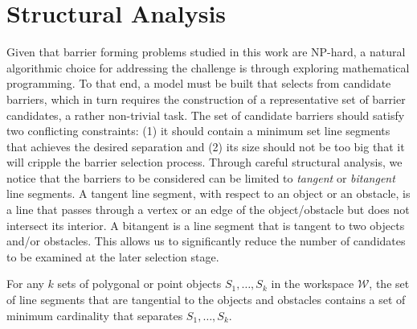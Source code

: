 
\section{Structural Analysis}
Given that barrier forming problems studied in this work are NP-hard, a natural algorithmic choice for addressing the challenge is through exploring  mathematical programming.
%
To that end, a model must be built that selects from candidate barriers, which in turn requires the construction of a representative set of barrier candidates, a rather non-trivial task. 
%
The set of candidate barriers should satisfy two conflicting constraints: (1) it should contain a minimum set line segments that achieves the desired separation and (2) its size should not be too big that it will cripple the barrier selection process. 
%
Through careful structural analysis, we notice that the barriers to be considered can be limited to \emph{tangent} or \emph{bitangent} line segments. A tangent line segment, with respect to an object or an obstacle, is a line that passes through a vertex or an edge of the object/obstacle but does not intersect its interior. A bitangent is a line segment that is tangent to two objects and/or obstacles. 
%
This allows us to significantly reduce the number of candidates to be examined at the later selection stage.

\begin{theorem}\label{theorem:bf-sin_tan}
For any $k$ sets of polygonal or point objects $S_1, \dots, S_k$ in the workspace $\mathcal W$, the set of line segments that are tangential to the objects and obstacles contains a set of minimum cardinality that separates $S_1, \dots, S_k$. 
\end{theorem}


